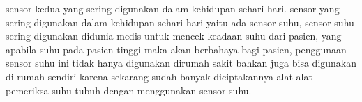 sensor kedua yang sering digunakan dalam kehidupan sehari-hari.
sensor yang sering digunakan dalam kehidupan sehari-hari yaitu ada sensor suhu, sensor suhu sering digunakan didunia medis untuk mencek keadaan suhu dari pasien, yang apabila suhu pada pasien tinggi maka akan berbahaya bagi pasien, penggunaan sensor suhu ini tidak hanya digunakan dirumah sakit bahkan juga bisa digunakan di rumah sendiri karena sekarang sudah banyak diciptakannya alat-alat pemeriksa suhu tubuh dengan menggunakan sensor suhu.